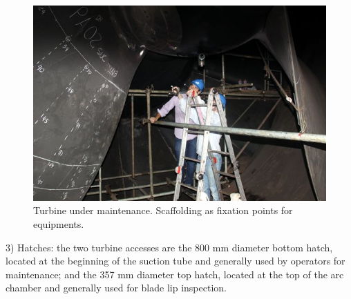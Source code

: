
\begin{figure}[h!]	
	\includegraphics[width=\columnwidth]{figs/viagem/2015_04_28/UG/img_4969}
	\caption{Turbine under maintenance. Scaffolding as fixation points for
	equipments.}
	\label{fig::andaime}
\end{figure}

 
3) Hatches: the two turbine accesses are the 800 mm diameter bottom hatch,
located at the beginning of the suction tube and generally used by operators
for maintenance; and the 357 mm diameter top hatch, located at the top of the
arc chamber and generally used for blade lip inspection.


